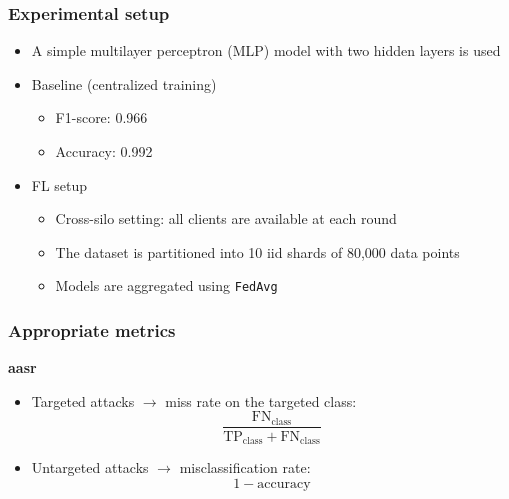 \documentclass[color,t,presentation,english,aspectratio=169]{beamer}
\begin{document}
\begin{frame}
\frametitle{Experimental setup}
\begin{itemize}
    \item A simple multilayer perceptron (MLP) model with two hidden layers is used
    \item Baseline (centralized training)
    \begin{itemize}
        \item F1-score: 0.966
        \item Accuracy: 0.992
    \end{itemize}
    \item FL setup
    \begin{itemize}
        \item Cross-silo setting: all clients are available at each round
        \item The dataset is partitioned into 10 \gls{iid} shards of 80,000 data points
        \item Models are aggregated using \texttt{FedAvg}
    \end{itemize}
\end{itemize}
\end{frame}

\begin{frame}
	\frametitle{Appropriate metrics}
	
	\textbf{\Acrfull{aasr}}\vspace{.5ex}

	\begin{itemize}
		\item Targeted attacks $\rightarrow$ miss rate on the targeted class:\vspace{.5ex}
		\begin{equation*}
			\frac{
				\text{FN}_\text{class}
			}{
				\text{TP}_\text{class} + \text{FN}_\text{class}
			}
		\end{equation*}\vspace{.5ex}

		\item Untargeted attacks $\rightarrow$ misclassification rate:\vspace{.5ex}
		\begin{equation*}
			1 - \text{accuracy}
		\end{equation*}

	\end{itemize}

\end{frame}
\end{document}

